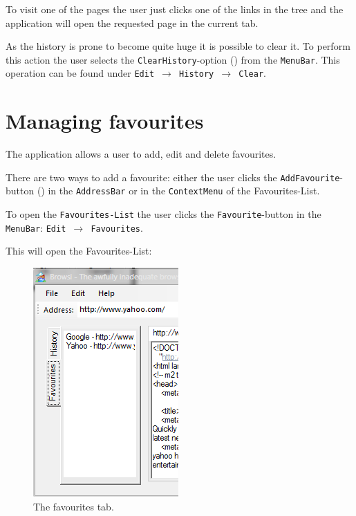 To visit one of the pages the user just clicks one of the links in the tree and the application will open the requested page in the current tab.

As the history is prone to become quite huge it is possible to clear it. To perform this action the user selects the \texttt{ClearHistory}-option () from the \texttt{MenuBar}. This operation can be found under \texttt{Edit $\rightarrow$ History $\rightarrow$ Clear}.

\section{Managing favourites}
\label{sec:managing_favourites}

The application allows a user to add, edit and delete favourites.

There are two ways to add a favourite: either the user clicks the \texttt{AddFavourite}-button () in the \texttt{AddressBar} or in the \texttt{ContextMenu} of the Favourites-List.

To open the \texttt{Favourites-List} the user clicks the \texttt{Favourite}-button in the \texttt{MenuBar}: \texttt{Edit $\rightarrow$ Favourites}.

This will open the Favourites-List:

\begin{figure}[H]
\begin{center}
\includegraphics[scale=1]{gfx/favourites.png}
\caption{The favourites tab.}
\label{fig:favourites_tab}
\end{center}
\end{figure}


